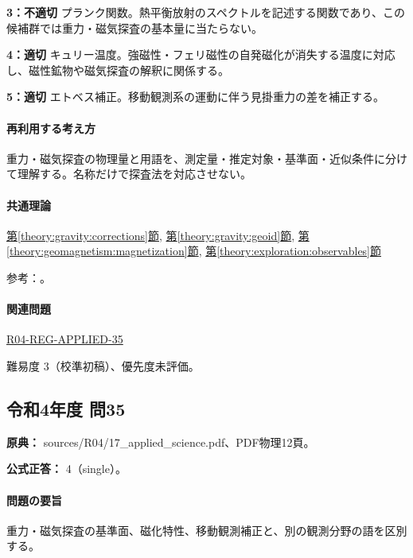 \noindent\textbf{3：不適切} プランク関数。熱平衡放射のスペクトルを記述する関数であり、この候補群では重力・磁気探査の基本量に当たらない。\par

\noindent\textbf{4：適切} キュリー温度。強磁性・フェリ磁性の自発磁化が消失する温度に対応し、磁性鉱物や磁気探査の解釈に関係する。\par

\noindent\textbf{5：適切} エトベス補正。移動観測系の運動に伴う見掛重力の差を補正する。\par

\paragraph{再利用する考え方} 重力・磁気探査の物理量と用語を、測定量・推定対象・基準面・近似条件に分けて理解する。名称だけで探査法を対応させない。

\paragraph{共通理論} \hyperref[theory:gravity:corrections]{第\ref*{theory:gravity:corrections}節}, \hyperref[theory:gravity:geoid]{第\ref*{theory:gravity:geoid}節}, \hyperref[theory:geomagnetism:magnetization]{第\ref*{theory:geomagnetism:magnetization}節}, \hyperref[theory:exploration:observables]{第\ref*{theory:exploration:observables}節}

\par 参考：\cite{gsi_gravity_definitions,kanaya_okuma2011}。

\paragraph{関連問題} \hyperref[q:r04-reg-applied-35]{R04-REG-APPLIED-35}

\par 難易度 3（校準初稿）、優先度未評価。

\subsection{令和4年度 問35}
\label{q:r04-reg-applied-35}

\noindent\textbf{原典：} sources/R04/17\_applied\_science.pdf、PDF物理12頁。

\textbf{公式正答：} 4（single）。

\paragraph{問題の要旨} 重力・磁気探査の基準面、磁化特性、移動観測補正と、別の観測分野の語を区別する。

